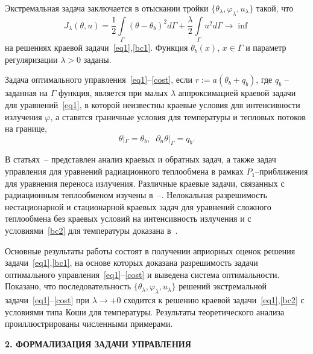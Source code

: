 \documentclass[12pt]{article}
\begin{document}
    Экстремальная задача заключается в отыскании тройки $\{\theta_\lambda,\varphi_\lambda,u_\lambda\}$ такой, что
    \begin{equation}
        \label{cost}
        J_\lambda(\theta, u) = \frac{1}{2}\int\limits_\Gamma (\theta - \theta_b)^2d\Gamma
        + \frac{\lambda}{2}\int\limits_\Gamma u^2d\Gamma \rightarrow\inf
    \end{equation}
    на решениях краевой задачи~\eqref{eq1},\eqref{bc1}.
    Функция $\theta_b(x),\, x\in\Gamma$  и параметр регуляризации $\lambda>0$ заданы.

    Задача оптимального управления~\eqref{eq1}--\eqref{cost}, если
    $r:=a(\theta_b+q_b)$, где $q_b$ -- заданная на $\Gamma$ функция,
    является при малых $\lambda$ аппроксимацией краевой задачи для уравнений~\eqref{eq1}, в которой
    неизвестны краевые условия для интенсивности излучения $\varphi$, а ставятся
    граничные условия для температуры и тепловых потоков на границе,
    \begin{equation}
        \label{bc2}
        \theta|_\Gamma = \theta_b,\;\;
        \partial_n\theta|_\Gamma = q_b.
    \end{equation}


    В статьях~\cite{Pinnau07}--\cite{JMAA-19} представлен анализ
    краевых и обратных задач, а также задач управления для уравнений радиационного теплообмена
    в рамках $P_1$--приближения для уравнения переноса излучения.
    Различные краевые задачи, связанных с радиационным теплообменом
    изучены в~\cite{AmosA05}--\cite{Amosov18}.
    Нелокальная разрешимость нестационарной и стационарной краевых задач
    для уравнений сложного теплообмена
    без краевых условий на интенсивность излучения и
    с условиями~\eqref{bc2} для температуры доказана в~\cite{CNSNS19,CMMP20}.


    Основные результаты работы состоят в получении априорных оценок
    решения задачи~\eqref{eq1},\eqref{bc1}, на основе которых
    доказана разрешимость задачи оптимального управления~\eqref{eq1}--\eqref{cost} и выведена система оптимальности.
    Показано, что
    последовательность $\{\theta_\lambda,\varphi_\lambda,u_\lambda\}$ решений
    экстремальной задачи~\eqref{eq1}--\eqref{cost} при $\lambda\to +0$
    сходится к решению краевой задачи~\eqref{eq1},\eqref{bc2} с условиями типа Коши для температуры.
    Результаты теоретического анализа проиллюстрированы численными примерами.


    \begin{center}
        \textbf{2. ФОРМАЛИЗАЦИЯ ЗАДАЧИ УПРАВЛЕНИЯ}
    \end{center}
\end{document}
